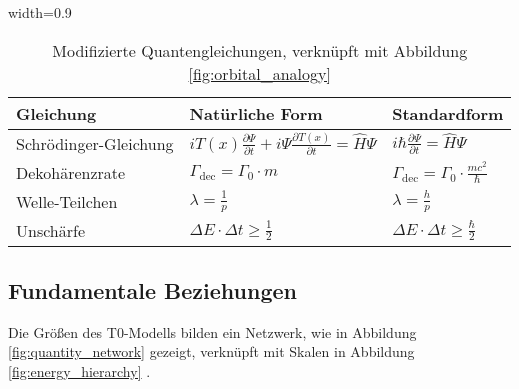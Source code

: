 \documentclass[12pt,a4paper]{article}
\newcommand{\Tfield}{T(x)}
\newcommand{\tablescale}{0.9}
\begin{document}
	\begin{table}[htbp]
		\centering
		\begin{adjustbox}{width=\tablescale\textwidth}
			\begin{tabular}{lll}
				\toprule
				\textbf{Gleichung} & \textbf{Natürliche Form} & \textbf{Standardform} \\
				\midrule
				Schrödinger-Gleichung & \(i \Tfield \frac{\partial \Psi}{\partial t} + i \Psi \frac{\partial \Tfield}{\partial t} = \hat{H} \Psi\) & \(i \hbar \frac{\partial \Psi}{\partial t} = \hat{H} \Psi\) \\
				Dekohärenzrate & \(\Gamma_{\text{dec}} = \Gamma_0 \cdot m\) & \(\Gamma_{\text{dec}} = \Gamma_0 \cdot \frac{m c^2}{\hbar}\) \\
				Welle-Teilchen & \(\lambda = \frac{1}{p}\) & \(\lambda = \frac{h}{p}\) \\
				Unschärfe & \(\Delta E \cdot \Delta t \geq \frac{1}{2}\) & \(\Delta E \cdot \Delta t \geq \frac{\hbar}{2}\) \\
				\bottomrule
			\end{tabular}
		\end{adjustbox}
		\caption{Modifizierte Quantengleichungen, verknüpft mit Abbildung \ref{fig:orbital_analogy}}
		\label{tab:qm_equations}
	\end{table}
	
	\subsection{Fundamentale Beziehungen}
	\label{subsec:relationships}
	
	Die Größen des T0-Modells bilden ein Netzwerk, wie in Abbildung \ref{fig:quantity_network} gezeigt, verknüpft mit Skalen in Abbildung \ref{fig:energy_hierarchy} \cite{pascher_grundkraefte_2025}.
	
\end{document}
